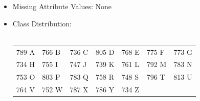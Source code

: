 \documentclass[10pt]{report}
\begin{document}
\begin{itemize}
\item Missing Attribute Values: None
\item Class Distribution:
  \\\\
  \begin{left}
    \begin{tabular}{ l l l l l l l }
 	789 A	   & 766 B     & 736 C     & 805 D	 & 768 E	   & 775 F     & 773 G \\
 	734 H	   & 755 I     & 747 J     & 739 K	 & 761 L	   & 792 M     & 783 N \\
 	753 O	   & 803 P     & 783 Q     & 758 R	 & 748 S	   & 796 T     & 813 U \\
 	764 V	   & 752 W     & 787 X     & 786 Y	 & 734 Z \\
    \end{tabular}
  \end{left}
\end{itemize}
\end{document}
